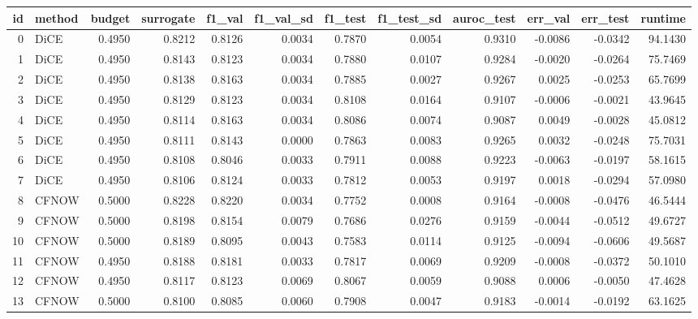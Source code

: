 \begin{tabular}{rlrrrrrrrrrr}
\toprule
 id & method &  budget &  surrogate &  f1\_val &  f1\_val\_sd &  f1\_test &  f1\_test\_sd &  auroc\_test &  err\_val &  err\_test &  runtime \\
\midrule
  0 &   DiCE &  0.4950 &     0.8212 &  0.8126 &     0.0034 &   0.7870 &      0.0054 &      0.9310 &  -0.0086 &   -0.0342 &  94.1430 \\
  1 &   DiCE &  0.4950 &     0.8143 &  0.8123 &     0.0034 &   0.7880 &      0.0107 &      0.9284 &  -0.0020 &   -0.0264 &  75.7469 \\
  2 &   DiCE &  0.4950 &     0.8138 &  0.8163 &     0.0034 &   0.7885 &      0.0027 &      0.9267 &   0.0025 &   -0.0253 &  65.7699 \\
  3 &   DiCE &  0.4950 &     0.8129 &  0.8123 &     0.0034 &   0.8108 &      0.0164 &      0.9107 &  -0.0006 &   -0.0021 &  43.9645 \\
  4 &   DiCE &  0.4950 &     0.8114 &  0.8163 &     0.0034 &   0.8086 &      0.0074 &      0.9087 &   0.0049 &   -0.0028 &  45.0812 \\
  5 &   DiCE &  0.4950 &     0.8111 &  0.8143 &     0.0000 &   0.7863 &      0.0083 &      0.9265 &   0.0032 &   -0.0248 &  75.7031 \\
  6 &   DiCE &  0.4950 &     0.8108 &  0.8046 &     0.0033 &   0.7911 &      0.0088 &      0.9223 &  -0.0063 &   -0.0197 &  58.1615 \\
  7 &   DiCE &  0.4950 &     0.8106 &  0.8124 &     0.0033 &   0.7812 &      0.0053 &      0.9197 &   0.0018 &   -0.0294 &  57.0980 \\
  8 &  CFNOW &  0.5000 &     0.8228 &  0.8220 &     0.0034 &   0.7752 &      0.0008 &      0.9164 &  -0.0008 &   -0.0476 &  46.5444 \\
  9 &  CFNOW &  0.5000 &     0.8198 &  0.8154 &     0.0079 &   0.7686 &      0.0276 &      0.9159 &  -0.0044 &   -0.0512 &  49.6727 \\
 10 &  CFNOW &  0.5000 &     0.8189 &  0.8095 &     0.0043 &   0.7583 &      0.0114 &      0.9125 &  -0.0094 &   -0.0606 &  49.5687 \\
 11 &  CFNOW &  0.4950 &     0.8188 &  0.8181 &     0.0033 &   0.7817 &      0.0069 &      0.9209 &  -0.0008 &   -0.0372 &  50.1010 \\
 12 &  CFNOW &  0.4950 &     0.8117 &  0.8123 &     0.0069 &   0.8067 &      0.0059 &      0.9088 &   0.0006 &   -0.0050 &  47.4628 \\
 13 &  CFNOW &  0.5000 &     0.8100 &  0.8085 &     0.0060 &   0.7908 &      0.0047 &      0.9183 &  -0.0014 &   -0.0192 &  63.1625 \\

\end{tabular}
